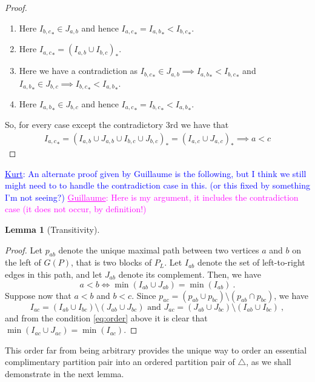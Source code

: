 \documentclass[11pt]{amsart}
\newtheorem{lemma}[thm]{Lemma}
\theoremstyle{definition}
\theoremstyle{remark}
\numberwithin{equation}{section}
\newcommand{\0}{\color{blue}{\mathsf{0}}}
\newcommand{\Guillaume}[1]{\textcolor{magenta}{\underline{Guillaume}: #1}}
\newcommand{\Kurt}[1]{\textcolor{blue}{\underline{Kurt}: #1}}
\begin{document}
\begin{proof}
\begin{enumerate}
    \item Here ${I_{b,c}}_* \in J_{a,b}$ and hence ${I_{a,c}}_*={I_{a,b}}_*<{I_{b,c}}_*$.
    \item Here ${I_{a,c}}_* = ({I_{a,b}} \cup {I_{b,c}})_*$.
    \item Here we have a contradiction as ${I_{b,c}}_* \in J_{a,b} \implies {I_{a,b}}_*<{I_{b,c}}_*$  and ${I_{a,b}}_* \in J_{b,c} \implies {I_{b,c}}_*<{I_{a,b}}_*$.
    \item Here ${I_{a,b}}_* \in J_{b,c}$ and hence ${I_{a,c}}_*={I_{b,c}}_*<{I_{a,b}}_*$. 
\end{enumerate}
So, for every case except the contradictory $3$rd we have that \begin{align*}
    {I_{a,c}}_* = ({I_{a,b}} \cup J_{a,b} \cup {I_{b,c}} \cup J_{b,c})_* = ({I_{a,c}} \cup J_{a,c})_* \implies a < c 
\end{align*}
\end{proof}
\Kurt{An alternate proof given by Guillaume is the following, but I think we still might need to to handle the contradiction case in this. (or this fixed by something I'm not seeing?)}
\Guillaume{Here is my argument, it includes the contradiction case (it does not occur, by definition!)}

\begin{lemma}[Transitivity]
\end{lemma}
\begin{proof}
    Let $p_{ab}$ denote the unique maximal path between two vertices $a$ and $b$ on the left of $G(P)$, that is two blocks of $P_L$. 
    Let $I_{ab}$ denote the set of left-to-right edges in this path, and let $J_{ab}$ denote its complement. 
    Then, we have 
    \begin{equation}
        \label{eq:order}
        a < b \iff \min(I_{ab}\cup J_{ab})=\min(I_{ab}) \ . 
    \end{equation}
    Suppose now that $a < b$ and $b < c$.
    Since $p_{ac}= (p_{ab} \cup p_{bc}) \setminus (p_{ab} \cap p_{bc})$, we have $$ I_{ac}=(I_{ab}\cup I_{bc}) \setminus (J_{ab} \cup J_{bc}) \text{ and } J_{ac}=(J_{ab}\cup J_{bc}) \setminus (I_{ab} \cup I_{bc}) \ , $$ and from the condition \cref{eq:order} above it is clear that $\min(I_{ac}\cup J_{ac})=\min(I_{ac})$.
\end{proof}

This order far from being arbitrary provides the unique way to order an essential complimentary partition pair into an ordered partition pair of $\triangle$, as we shall demonstrate in the next lemma.
\end{document}
